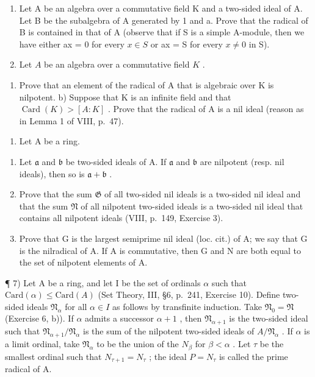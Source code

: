 \begin{enumerate}
\def\labelenumi{\arabic{enumi})}
\setcounter{enumi}{3}
\item
  Let A be an algebra over a commutative field K and a two-sided ideal of A. Let B be the subalgebra of A generated by 1 and a. Prove that the radical of B is contained in that of A (observe that if S is a simple A-module, then we have either ax = 0 for every \(x \in S\) or ax = S for every \(x \neq 0\) in S).
\item
  Let \(A\) be an algebra over a commutative field \(K\) .
\end{enumerate}

\begin{enumerate}
\def\labelenumi{\alph{enumi})}
\tightlist
\item
  Prove that an element of the radical of A that is algebraic over K is nilpotent. b) Suppose that K is an infinite field and that \(\operatorname{Card}(K) > [A : K]\) . Prove that the radical of A is a nil ideal (reason as in Lemma 1 of VIII, p.~47).
\end{enumerate}

\begin{enumerate}
\def\labelenumi{\arabic{enumi})}
\setcounter{enumi}{5}
\tightlist
\item
  Let \(\mathrm{A}\) be a ring.
\end{enumerate}

\begin{enumerate}
\def\labelenumi{\alph{enumi})}
\item
  Let \(\mathfrak{a}\) and \(\mathfrak{b}\) be two-sided ideals of A. If \(\mathfrak{a}\) and \(\mathfrak{b}\) are nilpotent (resp. nil ideals), then so is \(\mathfrak{a} + \mathfrak{b}\) .
\item
  Prove that the sum \(\mathfrak{G}\) of all two-sided nil ideals is a two-sided nil ideal and that the sum \(\mathfrak{N}\) of all nilpotent two-sided ideals is a two-sided nil ideal that contains all nilpotent ideals (VIII, p.~149, Exercise 3).
\item
  Prove that G is the largest semiprime nil ideal (loc. cit.) of A; we say that G is the nilradical of A. If A is commutative, then G and N are both equal to the set of nilpotent elements of A.
\end{enumerate}

¶ 7) Let A be a ring, and let I be the set of ordinals \(\alpha\) such that \(\text{Card}(\alpha) \leqslant \text{Card}(A)\) (Set Theory, III, §6, p.~241, Exercise 10). Define two-sided ideals \(\mathfrak{N}_{\alpha}\) for all \(\alpha \in I\) as follows by transfinite induction. Take \(\mathfrak{N}_0 = \mathfrak{N}\) (Exercise 6, b)). If \(\alpha\) admits a successor \(\alpha + 1\) , then \(\mathfrak{N}_{\alpha+1}\) is the two-sided ideal such that \(\mathfrak{N}_{\alpha+1}/\mathfrak{N}_{\alpha}\) is the sum of the nilpotent two-sided ideals of \(A/\mathfrak{N}_{\alpha}\) . If \(\alpha\) is a limit ordinal, take \(\mathfrak{N}_{\alpha}\) to be the union of the \(N_{\beta}\) for \(\beta < \alpha\) . Let \(\tau\) be the smallest ordinal such that \(N_{\tau+1} = N_{\tau}\) ; the ideal \(P = N_{\tau}\) is called the prime radical of A.

